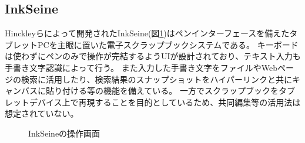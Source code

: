 
\subsection{InkSeine}
Hinckleyらによって開発されたInkSeine\cite{Hinckley2007InkSeineIS}(図\ref{inkseine})はペンインターフェースを備えたタブレットPCを主眼に置いた電子スクラップブックシステムである。
キーボードは使わずにペンのみで操作が完結するようUIが設計されており、テキスト入力も手書き文字認識によって行う。
また入力した手書き文字をファイルやWebページの検索に活用したり、検索結果のスナップショットをハイパーリンクと共にキャンバスに貼り付ける等の機能を備えている。
一方でスクラップブックをタブレットデバイス上で再現することを目的としているため、共同編集等の活用法は想定されていない。

\begin{figure}[H]
    \centering
    \caption{InkSeineの操作画面}
    \label{inkseine}
\end{figure}

